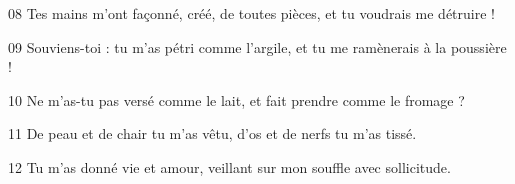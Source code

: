 08 Tes mains m’ont façonné, créé, de toutes pièces, et tu voudrais me détruire !

09 Souviens-toi : tu m’as pétri comme l’argile, et tu me ramènerais à la poussière !

10 Ne m’as-tu pas versé comme le lait, et fait prendre comme le fromage ?

11 De peau et de chair tu m’as vêtu, d’os et de nerfs tu m’as tissé.

12 Tu m’as donné vie et amour, veillant sur mon souffle avec sollicitude.